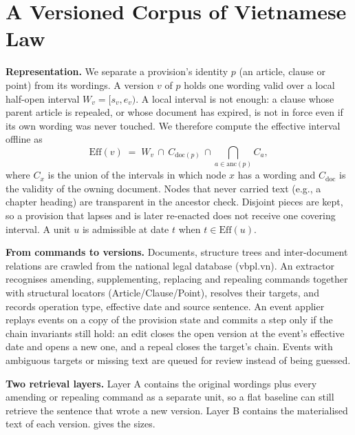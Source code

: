 \documentclass[conference]{IEEEtran}
\begin{document}
\section{A Versioned Corpus of Vietnamese Law}
\label{sec:corpus}

\textbf{Representation.} We separate a provision's identity $p$ (an article, clause or point) from its wordings. A version $v$ of $p$ holds one wording valid over a local half-open interval $W_v=[s_v,e_v)$. A local interval is not enough: a clause whose parent article is repealed, or whose document has expired, is not in force even if its own wording was never touched. We therefore compute the effective interval offline as
\begin{equation}
\mathrm{Eff}(v) \;=\; W_v \,\cap\, C_{\mathrm{doc}(p)} \,\cap\! \bigcap_{a\in\mathrm{anc}(p)}\! C_a ,
\label{eq:eff}
\end{equation}
where $C_x$ is the union of the intervals in which node $x$ has a wording and $C_{\mathrm{doc}}$ is the validity of the owning document. Nodes that never carried text (e.g., a chapter heading) are transparent in the ancestor check. Disjoint pieces are kept, so a provision that lapses and is later re-enacted does not receive one covering interval. A unit $u$ is admissible at date $t$ when $t\in\mathrm{Eff}(u)$.

\textbf{From commands to versions.} Documents, structure trees and inter-document relations are crawled from the national legal database (vbpl.vn). An extractor recognises amending, supplementing, replacing and repealing commands together with structural locators (Article/Clause/Point), resolves their targets, and records operation type, effective date and source sentence. An event applier replays events on a copy of the provision state and commits a step only if the chain invariants still hold: an edit closes the open version at the event's effective date and opens a new one, and a repeal closes the target's chain. Events with ambiguous targets or missing text are queued for review instead of being guessed.

\textbf{Two retrieval layers.} Layer A contains the original wordings plus every amending or repealing command as a separate unit, so a flat baseline can still retrieve the sentence that wrote a new version. Layer B contains the materialised text of each version.  gives the sizes.
\end{document}
